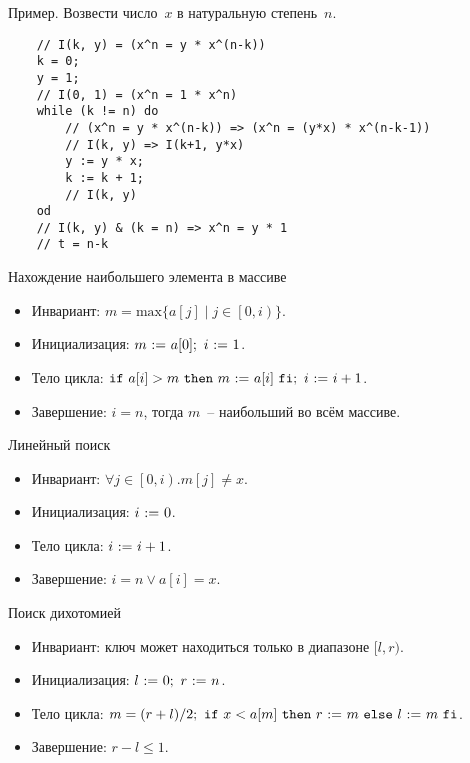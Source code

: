 \documentclass[landscape]{slides}
\begin{document}
\begin{slide}
Пример. Возвести число~$x$ в натуральную степень~$n$.
\begin{verbatim}
    // I(k, y) = (x^n = y * x^(n-k))
    k = 0;
    y = 1;
    // I(0, 1) = (x^n = 1 * x^n)
    while (k != n) do
        // (x^n = y * x^(n-k)) => (x^n = (y*x) * x^(n-k-1))
        // I(k, y) => I(k+1, y*x)
        y := y * x;
        k := k + 1;
        // I(k, y)
    od
    // I(k, y) & (k = n) => x^n = y * 1
    // t = n-k
\end{verbatim}
\end{slide}

\begin{slide}
Нахождение наибольшего элемента в массиве
\begin{itemize}
    \item Инвариант: $m = \mathrm{max} \{ a[j] \mid j \in \left[0, i\right) \}$.
    \item Инициализация: $m\assign a[0];\ i\assign 1$.
    \item Тело цикла: $\mathtt{if}\ {a[i] > m}\ \mathtt{then}\ {m\ \mathtt{:=}\  a[i]}\ \mathtt{fi};\ i\ \mathtt{:=}\  i+1$.
    \item Завершение: $i = n$, тогда $m$~-- наибольший во всём массиве.
\end{itemize}
\end{slide}

\begin{slide}
Линейный поиск
\begin{itemize}
    \item Инвариант: $\forall j \in \left[0, i\right). m[j] \ne x$.
    \item Инициализация: $i\ \mathtt{:=}\  0$.
    \item Тело цикла: $i\ \mathtt{:=}\  i+1$.
    \item Завершение: $i = n \lor a[i] = x$.
\end{itemize}
\end{slide}

\begin{slide}
Поиск дихотомией
\begin{itemize}
    \item Инвариант: ключ может находиться только в диапазоне $[l,r)$.
    \item Инициализация: $l\ \mathtt{:=}\  0;\ r\ \mathtt{:=}\  n$.
    \item Тело цикла: $m = (r+l)/2;\ \mathtt{if}\ {x < a[m]}\ \mathtt{then}\ {r\ \mathtt{:=}\  m}\ \mathtt{else}\ {l\ \mathtt{:=}\  m}\ \mathtt{fi}$. 
    \item Завершение: $r-l \leqslant 1$.
\end{itemize}
\end{slide}
\end{document}

